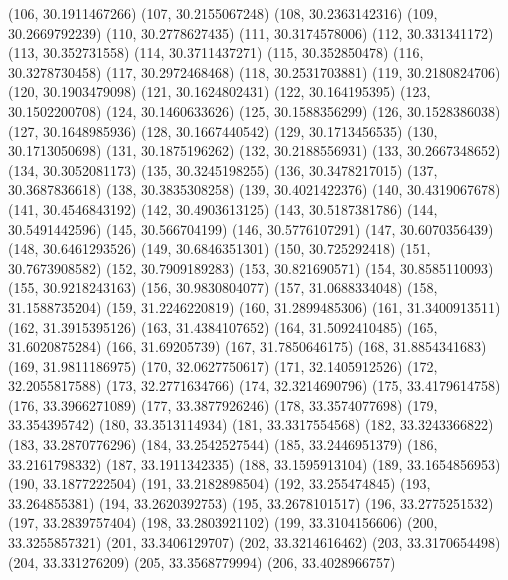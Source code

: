 {					(106, 30.1911467266)
					(107, 30.2155067248)
					(108, 30.2363142316)
					(109, 30.2669792239)
					(110, 30.2778627435)
					(111, 30.3174578006)
					(112, 30.331341172)
					(113, 30.352731558)
					(114, 30.3711437271)
					(115, 30.352850478)
					(116, 30.3278730458)
					(117, 30.2972468468)
					(118, 30.2531703881)
					(119, 30.2180824706)
					(120, 30.1903479098)
					(121, 30.1624802431)
					(122, 30.164195395)
					(123, 30.1502200708)
					(124, 30.1460633626)
					(125, 30.1588356299)
					(126, 30.1528386038)
					(127, 30.1648985936)
					(128, 30.1667440542)
					(129, 30.1713456535)
					(130, 30.1713050698)
					(131, 30.1875196262)
					(132, 30.2188556931)
					(133, 30.2667348652)
					(134, 30.3052081173)
					(135, 30.3245198255)
					(136, 30.3478217015)
					(137, 30.3687836618)
					(138, 30.3835308258)
					(139, 30.4021422376)
					(140, 30.4319067678)
					(141, 30.4546843192)
					(142, 30.4903613125)
					(143, 30.5187381786)
					(144, 30.5491442596)
					(145, 30.566704199)
					(146, 30.5776107291)
					(147, 30.6070356439)
					(148, 30.6461293526)
					(149, 30.6846351301)
					(150, 30.725292418)
					(151, 30.7673908582)
					(152, 30.7909189283)
					(153, 30.821690571)
					(154, 30.8585110093)
					(155, 30.9218243163)
					(156, 30.9830804077)
					(157, 31.0688334048)
					(158, 31.1588735204)
					(159, 31.2246220819)
					(160, 31.2899485306)
					(161, 31.3400913511)
					(162, 31.3915395126)
					(163, 31.4384107652)
					(164, 31.5092410485)
					(165, 31.6020875284)
					(166, 31.69205739)
					(167, 31.7850646175)
					(168, 31.8854341683)
					(169, 31.9811186975)
					(170, 32.0627750617)
					(171, 32.1405912526)
					(172, 32.2055817588)
					(173, 32.2771634766)
					(174, 32.3214690796)
					(175, 33.4179614758)
					(176, 33.3966271089)
					(177, 33.3877926246)
					(178, 33.3574077698)
					(179, 33.354395742)
					(180, 33.3513114934)
					(181, 33.3317554568)
					(182, 33.3243366822)
					(183, 33.2870776296)
					(184, 33.2542527544)
					(185, 33.2446951379)
					(186, 33.2161798332)
					(187, 33.1911342335)
					(188, 33.1595913104)
					(189, 33.1654856953)
					(190, 33.1877222504)
					(191, 33.2182898504)
					(192, 33.255474845)
					(193, 33.264855381)
					(194, 33.2620392753)
					(195, 33.2678101517)
					(196, 33.2775251532)
					(197, 33.2839757404)
					(198, 33.2803921102)
					(199, 33.3104156606)
					(200, 33.3255857321)
					(201, 33.3406129707)
					(202, 33.3214616462)
					(203, 33.3170654498)
					(204, 33.331276209)
					(205, 33.3568779994)
					(206, 33.4028966757)
}
